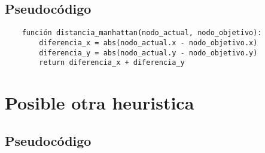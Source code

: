 \subsection*{Pseudocódigo}
\begin{verbatim}
    función distancia_manhattan(nodo_actual, nodo_objetivo):
        diferencia_x = abs(nodo_actual.x - nodo_objetivo.x)
        diferencia_y = abs(nodo_actual.y - nodo_objetivo.y)
        return diferencia_x + diferencia_y
    \end{verbatim}
\section{Posible otra heuristica}

\subsection*{Pseudocódigo}

